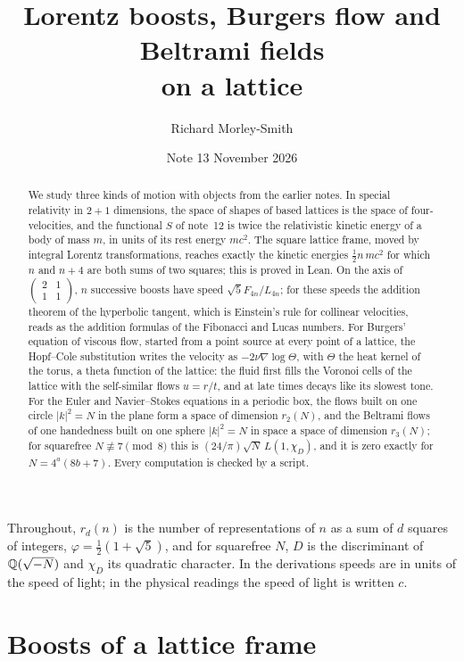 \documentclass[11pt]{article}
\title{Lorentz boosts, Burgers flow and Beltrami fields\\ on a lattice}
\author{Richard Morley-Smith}
\date{Note 13 \quad November 2026}
\begin{document}
\maketitle

\begin{abstract}
\noindent
We study three kinds of motion with objects from the earlier notes.
In special relativity in $2+1$ dimensions, the space of shapes of based lattices is the space of four-velocities, and the functional $S$ of note~12 is twice the relativistic kinetic energy of a body of mass $m$, in units of its rest energy $mc^2$.
The square lattice frame, moved by integral Lorentz transformations, reaches exactly the kinetic energies $\tfrac12 n\,mc^2$ for which $n$ and $n+4$ are both sums of two squares; this is proved in Lean.
On the axis of $\left(\begin{smallmatrix}2&1\\1&1\end{smallmatrix}\right)$, $n$ successive boosts have speed $\sqrt5F_{4n}/L_{4n}$; for these speeds the addition theorem of the hyperbolic tangent, which is Einstein's rule for collinear velocities, reads as the addition formulas of the Fibonacci and Lucas numbers.
For Burgers' equation of viscous flow, started from a point source at every point of a lattice, the Hopf--Cole substitution writes the velocity as $-2\nu\nabla\log\Theta$, with $\Theta$ the heat kernel of the torus, a theta function of the lattice: the fluid first fills the Voronoi cells of the lattice with the self-similar flows $u = r/t$, and at late times decays like its slowest tone.
For the Euler and Navier--Stokes equations in a periodic box, the flows built on one circle $|k|^2 = N$ in the plane form a space of dimension $r_2(N)$, and the Beltrami flows of one handedness built on one sphere $|k|^2 = N$ in space a space of dimension $r_3(N)$; for squarefree $N\not\equiv7\pmod8$ this is $(24/\pi)\sqrt N\,L(1,\chi_D)$, and it is zero exactly for $N = 4^a(8b+7)$.
Every computation is checked by a script.
\end{abstract}

\noindent
Throughout, $r_d(n)$ is the number of representations of $n$ as a sum of $d$ squares of integers, $\varphi = \tfrac12(1+\sqrt5)$, and for squarefree $N$, $D$ is the discriminant of $\mathbb{Q}(\sqrt{-N})$ and $\chi_D$ its quadratic character.
In the derivations speeds are in units of the speed of light; in the physical readings the speed of light is written $c$.

\section{Boosts of a lattice frame}
\end{document}

